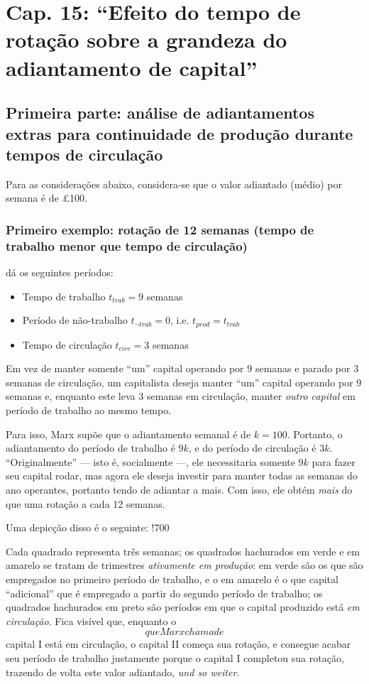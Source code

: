\section{Cap. 15: ``Efeito do tempo de rotação sobre a grandeza do adiantamento de capital''}
\subsection{Primeira parte: análise de adiantamentos extras para continuidade de produção durante tempos de circulação}
Para as considerações abaixo, considera-se que o valor adiantado (médio) por semana é de £100. 

\subsubsection{Primeiro exemplo: rotação de 12 semanas (tempo de trabalho menor que tempo de circulação)}
\parencite[p. 356-7]{Marx2014} dá os seguintes períodos:
\begin{itemize}
\item Tempo de trabalho $t_{trab} = 9$ semanas
\item Período de não-trabalho $t_{\lnot trab}=0$, i.e. $t_{prod}=t_{trab}$
\item Tempo de circulação $t_{circ}=3$ semanas
\end{itemize}

Em vez de manter somente ``um'' capital operando por $9$ semanas e parado por $3$ semanas de circulação, um capitalista deseja manter ``um'' capital operando por $9$ semanas e, enquanto este leva $3$ semanas em circulação, manter \textit{outro capital} em período de trabalho ao mesmo tempo.

Para isso, Marx supõe que o adiantamento semanal é de $k=100$. Portanto, o adiantamento do período de trabalho é $9k$, e do período de circulação é $3k$. ``Originalmente'' — isto é, socialmente —, ele necessitaria somente $9k$ para fazer seu capital rodar, mas agora ele deseja investir para manter todas as semanas do ano operantes, portanto tendo de adiantar a mais. Com isso, ele obtém \textit{mais} do que uma rotação a cada 12 semanas.

Uma depicção disso é o seguinte:
!700

Cada quadrado representa três semanas; os quadrados hachurados em verde e em amarelo se tratam de trimestres \textit{ativamente em produção}: em verde são os que são empregados no primeiro período de trabalho, e o em amarelo é o que capital ``adicional'' que é empregado a partir do segundo período de trabalho; os quadrados hachurados em preto são períodos em que o capital produzido está \textit{em circulação}. Fica visível que, enquanto o \[que Marx chama de\] capital I está em circulação, o capital II começa sua rotação, e consegue acabar seu período de trabalho justamente porque o capital I completou sua rotação, trazendo de volta este valor adiantado, \textit{und so weiter}.


